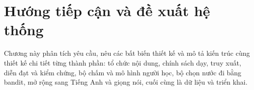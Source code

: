 \chapter{Hướng tiếp cận và đề xuất hệ thống}\label{chap:design}
Chương này phân tích yêu cầu, nêu các bất biến thiết kế và mô tả kiến trúc cùng thiết kế chi tiết từng thành phần: tổ chức nội dung, chính sách dạy, truy xuất, diễn đạt và kiểm chứng, bộ chấm và mô hình người học, bộ chọn nước đi bằng bandit, mở rộng sang Tiếng Anh và giọng nói, cuối cùng là dữ liệu và triển khai.











